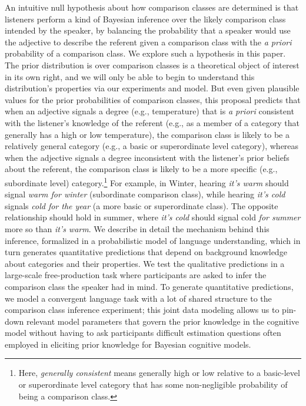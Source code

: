 \documentclass[doc]{apa6}
\begin{document}
An intuitive null hypothesis about how comparison classes are determined is that listeners perform a kind of Bayesian inference over the likely comparison class intended by the speaker, by balancing the probability that a speaker would use the adjective to describe the referent given a comparison class with the \emph{a priori} probability of a comparison class.
We explore such a hypothesis in this paper.
The prior distribution is over comparison classes is a theoretical object of interest in its own right, and we will only be able to begin to understand this distribution's properties via our experiments and model.%
But even given plausible values for the prior probabilities of comparison classes, this proposal predicts that when an adjective signals a degree (e.g., temperature) that is \emph{a priori} consistent with the listener's knowledge of the referent (e.g., as a member of a category that generally has a high or low temperature), the comparison class is likely to be a relatively general category (e.g., a basic or superordinate level category), whereas when the adjective signals a degree inconsistent with the listener's prior beliefs about the referent, the comparison class is likely to be a more specific (e.g., subordinate level) category.\footnote{Here, \emph{generally consistent} means generally high or low relative to a basic-level or superordinate level category that has some non-negligible probability of being a comparison class.}
For example, in Winter, hearing \emph{it's warm} should signal \emph{warm for winter} (subordinate comparison class), while hearing \emph{it's cold} signals \emph{cold for the year} (a more basic or superordinate class). 
The opposite relationship should hold in summer, where \emph{it's cold} should signal cold \emph{for summer} more so than \emph{it's warm}. 
We describe in detail the mechanism behind this inference, formalized in a probabilistic model of language understanding, which in turn generates quantitative predictions that depend on background knowledge about categories and their properties. 
We test the qualitative predictions in a large-scale free-production task where participants are asked to infer the comparison class the speaker had in mind. 
To generate quantitative predictions, we model a convergent language task with a lot of shared structure to the comparison class inference experiment; this joint data modeling allows us to pin-down relevant model parameters that govern the prior knowledge in the cognitive model without having to ask participants difficult estimation questions often employed in eliciting prior knowledge for Bayesian cognitive models. 
\end{document}
